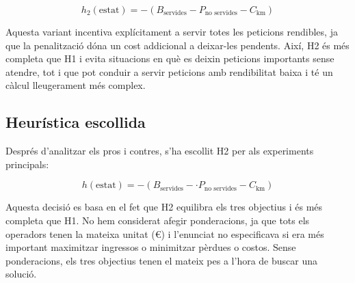 \begin{equation}
h_2(\text{estat}) = -(B_{\text{servides}} - P_{\text{no servides}} - C_{\text{km}})
\end{equation}

Aquesta variant incentiva explícitament a servir totes les peticions rendibles, ja que la penalització dóna un cost addicional a deixar-les pendents. Així, H2 és més completa que H1 i evita situacions en què es deixin peticions importants sense atendre, tot i que pot conduir a servir peticions amb rendibilitat baixa i té un càlcul lleugerament més complex.

\vspace{0.5cm}

\subsection{Heurística escollida}

Després d’analitzar els pros i contres, s’ha escollit H2 per als experiments principals:

\begin{equation}
h(\text{estat}) = -(B_{\text{servides}} - \cdot P_{\text{no servides}} - C_{\text{km}})
\end{equation}

Aquesta decisió es basa en el fet que H2 equilibra els tres objectius i és més completa que H1. No hem considerat afegir ponderacions, ja que tots els operadors tenen la mateixa unitat (€) i l'enunciat no especificava si era més important maximitzar ingressos o minimitzar pèrdues o costos. Sense ponderacions, els tres objectius tenen el mateix pes a l'hora de buscar una solució.

